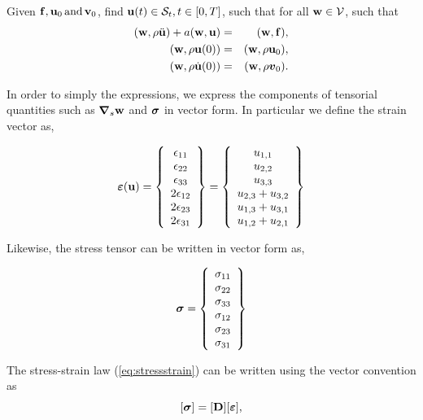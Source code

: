 Given $\mathbf{f}, \mathbf{u}_0 \operatorname{and} \mathbf{v}_0$, find $\mathbf{u}( t ) \in \mathcal{S}_t, t \in [ 0, T ]$,
such that for all $\mathbf{w} \in \mathcal{V}$, such that 
\begin{eqnarray}
  (\mathbf{w}, \rho \ddot{\mathbf{u}} ) + a (\mathbf{w},\mathbf{u}) &
  = & (\mathbf{w},\mathbf{f}), \\
  (\mathbf{w}, \rho \mathbf{u}( 0 ) ) & = & (\mathbf{w}, \rho \mathbf{u}_0 ), \nonumber\\
  (\mathbf{w}, \rho \dot{\mathbf{u}} ( 0 ) ) & = & (\mathbf{w}, \rho \boldsymbol{v}_0 ) \nonumber.
\end{eqnarray}

In order to simply the expressions, we express the components of tensorial quantities such as ${\boldsymbol{\nabla}}_s\mathbf{w}$ and ${\boldsymbol{\sigma}}$ in vector form. In particular we define the strain vector as,  

\[ 
	{\boldsymbol{\varepsilon}}(\mathbf{u}) = 
	\left\{ \begin{array}{c}
	\epsilon_{11} \\ \epsilon_{22} \\ \epsilon_{33} \\
	2\epsilon_{12} \\ 2\epsilon_{23} \\ 2\epsilon_{31}
	\end{array} \right\}  =
	\left\{ \begin{array}{c}
     u_{1, 1}\\
     u_{2, 2}\\
     u_{3, 3}\\
     u_{2, 3} + u_{3, 2}\\
     u_{1, 3} + u_{3, 1}\\
     u_{1, 2} + u_{2, 1}
   \end{array} \right\} 
\]

Likewise, the stress tensor can be written in vector form as,

\[
{\boldsymbol{\sigma}} = \left\{ \begin{array}{c}
	\sigma_{11} \\ \sigma_{22} \\ \sigma_{33} \\
	\sigma_{12} \\ \sigma_{23} \\ \sigma_{31} \end{array} \right\} 
\]

The stress-strain law (\ref{eq:stressstrain}) can be written using the vector convention as
\begin{equation}
\label{ref:stressstrainMat}
[{\boldsymbol{\sigma}}] = [\mathbf{D}][{\boldsymbol{\varepsilon}}],
\end{equation} 

